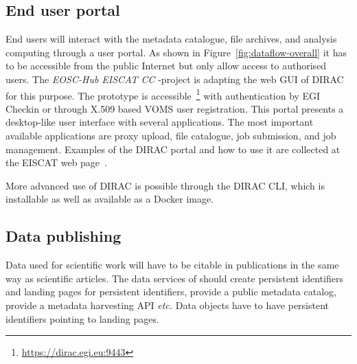 \documentclass[12pt,a4paper]{article}
\begin{document}
\subsection{End user portal}

End users will interact with the metadata catalogue, file archives, and analysis computing through a user portal. As shown in Figure~\ref{fig:dataflow-overall} it has to be accessible from the public Internet but only allow access to authorised users. 
The \emph{EOSC-Hub EISCAT CC} -project is adapting the web GUI of DIRAC~\cite{dirac} for this purpose. 
The prototype is accessible~\footnote{\url{https://dirac.egi.eu:9443}} with authentication by EGI Checkin or through X.509 based VOMS user registration. 
This portal presents a desktop-like user interface with several applications. 
The most important available applications are proxy upload, file catalogue, job submission, and job management. 
Examples of the DIRAC portal and how to use it are collected at the EISCAT web page~\cite{eiscat-dirac}.

More advanced use of DIRAC is possible through the DIRAC CLI, which is installable as well as available as a Docker image.

\subsection{Data publishing}

Data used for scientific work will have to be citable in publications in the same way as scientific articles.
The data services of \ED should create  persistent identifiers and landing pages for persistent identifiers, provide a public metadata catalog, provide a metadata harvesting API \emph{etc.}  Data objects have to have persistent identifiers pointing to landing pages. 

\end{document}
